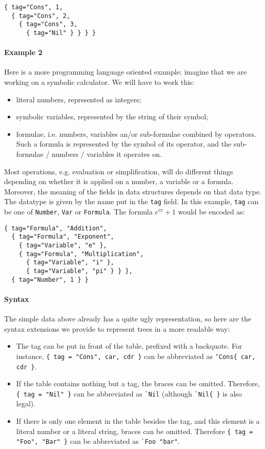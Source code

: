 \begin{verbatim}
{ tag="Cons", 1,
  { tag="Cons", 2,
    { tag="Cons", 3,
      { tag="Nil" } } } }
\end{verbatim}

\paragraph{Example 2}

Here is a more programming language oriented example: imagine that we
are working on a symbolic calculator. We will have to work this:
\begin{itemize}
\item literal numbers, represented as integers;
\item symbolic variables, represented by the string of their
  symbol;
\item formulae, i.e. numbers, variables an/or sub-formulae
  combined by operators. Such a formula is represented by the symbol
  of its operator, and the sub-formulae / numbers / variables it
  operates on.
\end{itemize}
Most operations, e.g. evaluation or simplification, will do different
things depending on whether it is applied on a number, a variable or a
formula. Moreover, the meaning of the fields in data structures depends
on that data type. The datatype is given by the name put in the
\verb+tag+ field. In this example, \verb+tag+ can be one of
\verb+Number+, \verb+Var+ or \verb+Formula+. The formula $e^{i\pi}+1$
would be encoded as:
\begin{verbatim}
{ tag="Formula", "Addition",
  { tag="Formula", "Exponent",
    { tag="Variable", "e" },
    { tag="Formula", "Multiplication",
      { tag="Variable", "i" },
      { tag="Variable", "pi" } } },
  { tag="Number", 1 } }
\end{verbatim}

\paragraph{Syntax}

The simple data above already has a quite ugly representation, so here
are the syntax extensions we provide to represent trees in a more
readable way:

\begin{itemize}
\item The tag can be put in front of the table, prefixed with a
  backquote. For instance, {\tt\{ tag = "Cons", car, cdr \}} can be
  abbreviated as {\tt`Cons\{ car, cdr \}}.
\item If the table contains nothing but a tag, the braces can be
  omitted. Therefore, \verb+{ tag = "Nil" }+ can be abbreviated as
  \verb+`Nil+ (although \verb|`Nil{ }| is also legal).
\item If there is only one element in the table besides the tag, and
  this element is a literal number or a literal string, braces can be
  omitted. Therefore {\tt\{ tag = "Foo", "Bar" \}} can be abbreviated
  as \verb+`Foo "bar"+.
\end{itemize}

